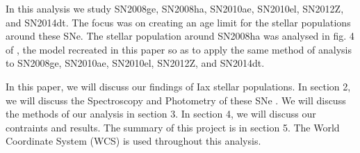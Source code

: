 \documentclass[preprint]{aastex}
\begin{document}
In this analysis we study SN2008ge, SN2008ha, 
SN2010ae, SN2010el, SN2012Z, and SN2014dt. 
The focus was on creating an age limit for the stellar populations around these SNe.
The stellar population around SN2008ha was analysed in fig. 4 of \citet{fol1409}, 
the model recreated in this paper so as to apply the same method 
of analysis to SN2008ge, SN2010ae, SN2010el, SN2012Z, and SN2014dt. 

In this paper, we will discuss our findings of Iax stellar populations.
In section 2, we will discuss the Spectroscopy and Photometry of these SNe .
We will discuss the methods of our analysis in section 3. 
In section 4, we will discuss our contraints and results.
The summary of this project is in section 5. 
The World Coordinate System (WCS) is used throughout this analysis. 




\end{document}
